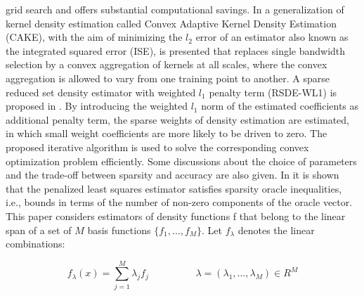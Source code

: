grid search and offers substantial computational savings. In \cite{mahapatruni2011cake} a generalization of kernel density estimation called Convex Adaptive Kernel Density Estimation (CAKE), with the aim of minimizing the $l_2$ error of an estimator also known as the integrated squared error (ISE), is presented that replaces single bandwidth selection by a convex aggregation of kernels at all scales, where the convex aggregation is allowed to vary from one training point to another.
A sparse reduced set density estimator with weighted $l_1$ penalty term (RSDE-WL1) is proposed in \cite{yang2015sparser}. By introducing the weighted $l_1$ norm of the estimated coefficients as additional penalty term, the sparse weights of density estimation are estimated, in which small weight coefficients are more likely to be driven to zero. The proposed iterative algorithm is used to solve the corresponding convex optimization problem efficiently. Some discussions about the choice of parameters and the trade-off between sparsity and accuracy are also given. In \cite{bunea2007sparse} it is shown that the penalized least squares estimator satisfies sparsity oracle inequalities, i.e., bounds in terms of the number of non-zero components of the oracle vector. This paper considers estimators of density functions f that belong to the linear span of a set of $M$ basis functions $\{f_1, \ldots, f_M\}$. Let $f_{\lambda}$  denotes the linear combinations:

\begin{equation}
\label{e2}
f_{\lambda}(x)=\sum_{j=1}^M \lambda_jf_j  \hspace{2cm} \lambda=(\lambda_1,\ldots, \lambda_M) \in R^M
\end{equation}
  
